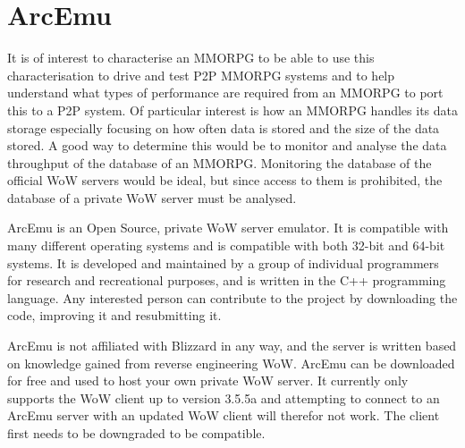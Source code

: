 

\section{ArcEmu}
\label{ch3}

It is of interest to characterise an MMORPG to be able to use this characterisation to drive and test P2P MMORPG systems and to help understand what types of performance are required from an MMORPG to port this to a P2P system. Of particular interest is how an MMORPG handles its data storage especially focusing on how often data is stored and the size of the data stored. A good way to determine this would be to monitor and analyse the data throughput of the database of an MMORPG. Monitoring the database of the official WoW servers would be ideal, but since access to them is prohibited, the database of a private WoW server must be analysed.


ArcEmu is an Open Source, private WoW server emulator. It is compatible with many different operating systems and is compatible with both 32-bit and 64-bit systems. It is developed and maintained by a group of individual programmers for research and recreational purposes, and is written in the C++ programming language. Any interested person can contribute to the project by downloading the code, improving it and resubmitting it.


ArcEmu is not affiliated with Blizzard in any way, and the server is written based on knowledge gained from reverse engineering WoW. ArcEmu can be downloaded for free and used to host your own private WoW server. It currently only supports the WoW client up to version 3.5.5a and attempting to connect to an ArcEmu server with an updated WoW client will therefor not work. The client first needs to be downgraded to be compatible.


